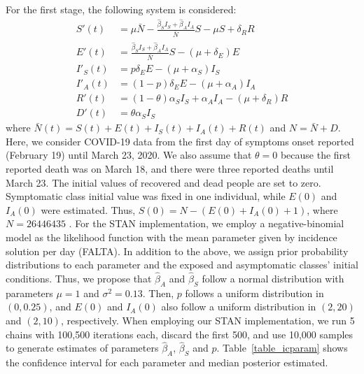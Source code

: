 For the first stage, the following system is considered:
\begin{equation}\label{model_stage1}
  \begin{aligned}
	S'(t)&=\mu \bar{N}-\frac{\hat{\beta}_S
	I_S+\hat{\beta}_AI_A}{\bar{N}}S-\mu S + \delta_R R\\
	E'(t)&= \frac{\hat{\beta}_S I_S+\hat{\beta}_A
	I_A}{\bar{N}}S-(\mu+\delta_E) E \\
	I'_S(t)&= p \delta_E E-(\mu+\alpha_S) I_S\\
	I'_A(t)&= (1-p) \delta_E E-(\mu+\alpha_A) I_A \\
	R'(t)&= (1-\theta) \alpha_S I_S+\alpha_A I_A-(\mu+\delta_R) R \\
	D'(t)&= \theta \alpha_S I_S
  \end{aligned}
\end{equation}
where $\bar{N}(t)=S(t)+E(t)+I_S(t)+I_A(t)+R(t)$ and $N=\bar{N}+D$. Here,
we consider COVID-19 data from the first day of symptoms onset reported
(February 19) until March 23, 2020. We also assume that $\theta = 0$
because the first reported death was on March 18, and there were three
reported deaths until March 23. The initial values of recovered and dead
people are set to zero. Symptomatic class initial value was fixed in one
individual, while $E(0)$ and $I_{A}(0)$ were estimated. Thus, $S(0) = N -
(E(0) + I_{A}(0) + 1)$, where $N = 26446435$ \cite{conavi2020}. For the
STAN implementation, we employ a negative-binomial model as the
likelihood function with the mean parameter given by incidence solution
per day (FALTA). In addition to the above, we assign prior probability
distributions to each parameter and the exposed and asymptomatic classes'
initial conditions. Thus, we propose that $\hat{\beta}_A$ and
$\hat{\beta}_S$ follow a normal distribution with parameters $\mu = 1$
and $\sigma^2 = 0.13$. Then,  $p$ follows a uniform distribution in $(0,
0.25)$, and $E(0)$ and $I_{A}(0)$ also follow a uniform distribution in
$(2,20)$ and $(2,10)$, respectively. When employing our STAN
implementation, we run 5 chains with 100,500 iterations each, discard the
first 500, and use 10,000 samples to generate estimates of parameters
$\hat{\beta}_A$, $\hat{\beta}_S$ and $p$. Table~\eqref{table_icparam}
shows the confidence interval for each parameter and median posterior
estimated.

